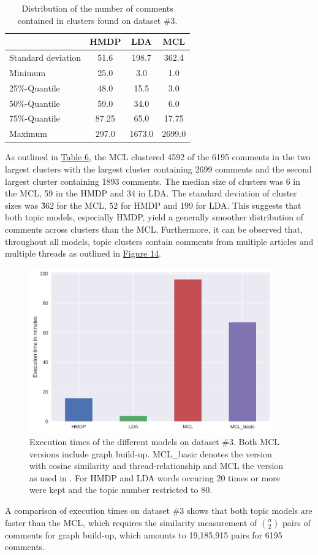 \begin{table}[H]
\label{clusterstruc}
\centering
\caption{Distribution of the number of comments contained in clusters found on dataset \#3.}
\begin{tabular}{||l||c|c|c||}
\hline
 & HMDP & LDA & MCL \\
\hline
Standard deviation & 51.6 & 198.7 & 362.4  \\
Minimum & 25.0 & 3.0 & 1.0 \\
25\%-Quantile & 48.0 & 15.5 & 3.0 \\
50\%-Quantile & 59.0 & 34.0 & 6.0 \\
75\%-Quantile & 87.25 & 65.0 & 17.75 \\
Maximum & 297.0 & 1673.0 & 2699.0 \\
\hline
\end{tabular}
\end{table}
As outlined in \hyperref[clusterstruc]{Table 6}, the MCL clustered 4592 of the 6195 comments in the two largest clusters with the largest cluster containing 2699 comments and the second largest cluster containing 1893 comments.
The median size of clusters was 6 in the MCL, 59 in the HMDP and 34 in LDA.
The standard deviation of cluster sizes was \~ 362 for the MCL, 52 for HMDP and 199 for LDA. This suggests that both topic models, especially HMDP, yield a generally smoother distribution of comments across clusters than the MCL.
Furthermore, it can be observed that, throughout all models, topic clusters contain comments from multiple articles and multiple threads as outlined in \hyperref[artthreads]{Figure 14}.

\begin{figure}[H]%
\centering
\includegraphics[height=2.8in]{img/exec_time_all_mts.png}%
\caption{Execution times of the different models on dataset \#3. Both MCL versions include graph build-up. MCL\_basic denotes the version with cosine similarity and thread-relationship and MCL the version as used in \cite{DBLP:conf/ecir/AkerKBPBHG16}. For HMDP and LDA words occuring 20 times or more were kept and the topic number restricted to 80.}
\end{figure}
A comparison of execution times on dataset \#3 shows that both topic models are faster than the MCL, which requires the similarity measurement of $\binom{n}{2}$ pairs of comments for graph build-up, which amounts to 19,185,915 pairs for 6195 comments.

